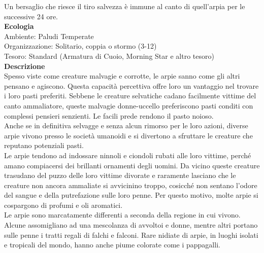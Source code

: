 \begin{multicols}{2}
Un bersaglio che riesce il tiro salvezza è immune al canto di quell'arpia per le successive 24 ore.\\
\textbf{Ecologia}\\
Ambiente: Paludi Temperate\\
Organizzazione: Solitario, coppia o stormo (3-12)\\
Tesoro: Standard (Armatura di Cuoio, Morning Star e altro tesoro)\\
\textbf{Descrizione}\\
Spesso viste come creature malvagie e corrotte, le arpie sanno come gli altri pensano e agiscono. Questa capacità percettiva offre loro un vantaggio nel trovare i loro pasti preferiti. Sebbene le creature selvatiche cadano facilmente vittime del canto ammaliatore, queste malvagie donne-uccello preferiscono pasti conditi con complessi pensieri senzienti. Le facili prede rendono il pasto noioso.\\
Anche se in definitiva selvagge e senza alcun rimorso per le loro azioni, diverse arpie vivono presso le società umanoidi e si divertono a sfruttare le creature che reputano potenziali pasti.\\
Le arpie tendono ad indossare ninnoli e ciondoli rubati alle loro vittime, perché amano compiacersi dei brillanti ornamenti degli uomini. Da vicino queste creature trasudano del puzzo delle loro vittime divorate e raramente lasciano che le creature non ancora ammaliate si avvicinino troppo, cosicché non sentano l'odore del sangue e della putrefazione sulle loro penne. Per questo motivo, molte arpie si cospargono di profumi e oli aromatici.\\
Le arpie sono marcatamente differenti a seconda della regione in cui vivono. Alcune assomigliano ad una mescolanza di avvoltoi e donne, mentre altri portano sulle penne i tratti regali di falchi e falconi. Rare nidiate di arpie, in luoghi isolati e tropicali del mondo, hanno anche piume colorate come i pappagalli.\\


\end{multicols}
